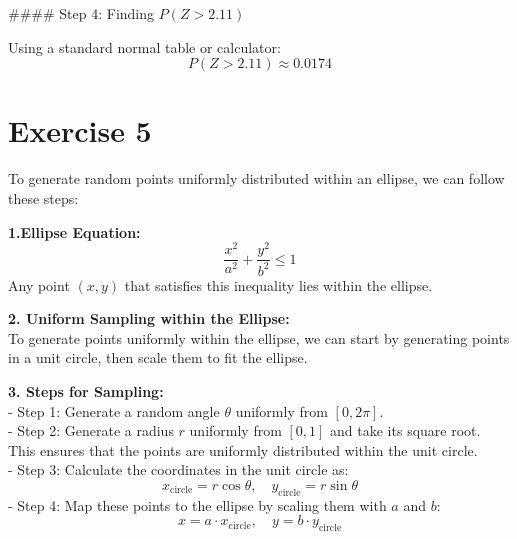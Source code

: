 \documentclass[a4paper,12pt]{article}
\begin{document}
#### Step 4: Finding \( P(Z > 2.11) \)

Using a standard normal table or calculator:
\[
P(Z > 2.11) \approx 0.0174
\]
\newpage
\section{Exercise 5}
To generate random points uniformly distributed within an ellipse, we can follow these steps:

\textbf{1.Ellipse Equation:}
   \[
   \frac{x^2}{a^2} + \frac{y^2}{b^2} \leq 1
   \]
   Any point \( (x, y) \) that satisfies this inequality lies within the ellipse.

\textbf{2. Uniform Sampling within the Ellipse:}
\\To generate points uniformly within the ellipse, we can start by generating points in a unit circle, then scale them to fit the ellipse.

\textbf{3. Steps for Sampling:}
   \\- Step 1: Generate a random angle \( \theta \) uniformly from \( [0, 2\pi] \).
   \\- Step 2: Generate a radius \( r \) uniformly from \( [0, 1] \) and take its square root. This ensures that the points are uniformly distributed within the unit circle.
   \\- Step 3: Calculate the coordinates in the unit circle as:
     \[
     x_{\text{circle}} = r \cos \theta, \quad y_{\text{circle}} = r \sin \theta
     \]
   - Step 4: Map these points to the ellipse by scaling them with \( a \) and \( b \):
     \[
     x = a \cdot x_{\text{circle}}, \quad y = b \cdot y_{\text{circle}}
     \]
\end{document}
